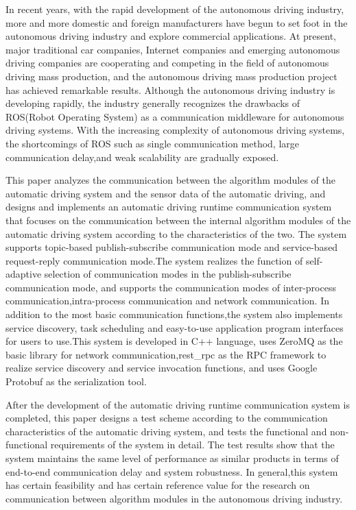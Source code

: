 \begin{abstract*}
  In recent years, with the rapid development of the autonomous driving industry,
  more and more domestic and foreign manufacturers have begun to set foot in the autonomous driving industry and explore commercial applications.
  At present, major traditional car companies, Internet companies and emerging autonomous driving companies are cooperating and competing in the field of autonomous driving mass production,
  and the autonomous driving mass production project has achieved remarkable results.
  Although the autonomous driving industry is developing rapidly,
  the industry generally recognizes the drawbacks of ROS(Robot Operating System) as a communication middleware for autonomous driving systems.
  With the increasing complexity of autonomous driving systems,
  the shortcomings of ROS such as single communication method,
  large communication delay,and weak scalability are gradually exposed.

  This paper analyzes the communication between the algorithm modules of the automatic driving system and the sensor data of the automatic driving,
  and designs and implements an automatic driving runtime communication system that focuses on the communication between the internal algorithm modules of the automatic driving system according to the characteristics of the two.
  The system supports topic-based publish-subscribe communication mode and service-based request-reply communication mode.The system realizes the function of self-adaptive selection of communication modes in the publish-subscribe communication mode,
  and supports the communication modes of inter-process communication,intra-process communication and network communication.
  In addition to the most basic communication functions,the system also implements service discovery,
  task scheduling and easy-to-use application program interfaces for users to use.This system is developed in C++ language,
  uses ZeroMQ as the basic library for network communication,rest\_rpc as the RPC framework to realize service discovery and service invocation functions,
  and uses Google Protobuf as the serialization tool.

  After the development of the automatic driving runtime communication system is completed,
  this paper designs a test scheme according to the communication characteristics of the automatic driving system,
  and tests the functional and non-functional requirements of the system in detail.
  The test results show that the system maintains the same level of performance as similar products in terms of end-to-end communication delay and system robustness.
  In general,this system has certain feasibility and has certain reference value for the research on communication between algorithm modules in the autonomous driving industry.
\end{abstract*}
